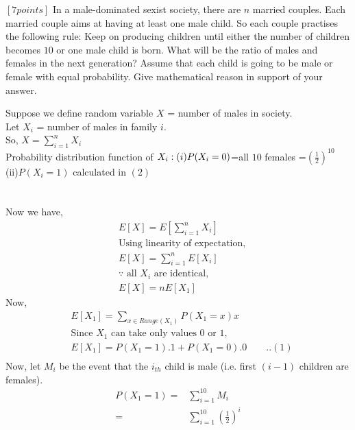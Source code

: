 \documentclass[12pt]{article}
\begin{document}
    \begin{question}
        $[7 points]$ In a male-dominated sexist society, there are $n$ married couples. Each married couple aims at having at least one male child. So each couple practises the following rule: Keep on producing children until either the number of children becomes $10$ or one male child is born. What will be the ratio of males and females in the next generation? Assume that each child is going to be male or female with equal probability. Give mathematical reason in support of your answer.
    \end{question}
    \begin{solution}
        Suppose we define random variable $X$ = number of males in society.\\
        Let $X_i$  = number of males in family $i$.\\
        So, $X=\sum_{i=1}^{n}X_i$\\
        Probability distribution function of $X_i:\\(i)P(X_i=0)$=all $10$ females =$(\frac{1}{2})^{10}$\\
        (ii)$P(X_i=1)$ calculated in $(2)$\\\\\\
        Now we have,
        \begin{align*}
            & E[X] = E[\sum_{i=1}^{n}X_i]\\
            & \text{Using linearity of expectation,}\\
            & E[X] = \sum_{i=1}^{n}E[X_i]\\
            & \text{$\because$ all $X_i$ are identical,}\\
            &E[X]=nE[X_1]
        \end{align*}
        Now,
        \begin{align*}
            & E[X_1] = \sum_{x \in Range(X_1)}P(X_1=x)x\\
            & \text{Since $X_1$ can take only values 0 or 1,}\\
            & E[X_1] = P(X_1=1).1+P(X_1=0).0 \quad\quad..(1)\\
        \end{align*}
        Now, let $M_i$ be the event that the $i_{th}$ child is male (i.e. first $(i-1)$ children are females).
        \begin{align*}
            P(X_1=1)=&\sum_{i=1}^{10}M_i\\
            =& \sum_{i=1}^{10}(\frac{1}{2})^i\\

\end{align*}
\end{solution}
\end{document}
